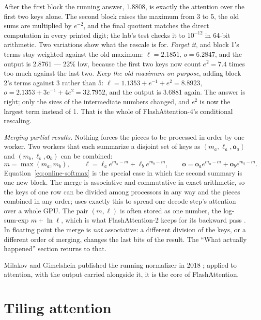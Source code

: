 \noindent After the first block the running answer, 1.8808, is exactly the
attention over the first two keys alone. The second block raises the maximum
from 3 to 5, the old sums are multiplied by $e^{-2}$, and the final quotient
matches the direct computation in every printed digit; the lab's test checks it
to $10^{-12}$ in 64-bit arithmetic. Two variations show what the rescale is for.
\emph{Forget it}, and block 1's terms stay weighted against the old maximum:
$\ell = 2.1851$, $o = 6.2847$, and the output is 2.8761 --- 22\% low, because
the first two keys now count $e^{2} = 7.4$ times too much against the last two.
\emph{Keep the old maximum on purpose}, adding block 2's terms against 3 rather
than 5: $\ell = 1.1353 + e^{-1} + e^{2} = 8.8923$,
$o = 2.1353 + 3e^{-1} + 4e^{2} = 32.7952$, and the output is 3.6881 again. The
answer is right; only the sizes of the intermediate numbers changed, and
$e^{2}$ is now the largest term instead of 1. That is the whole of
FlashAttention-4's conditional rescaling.

\emph{Merging partial results.} Nothing forces the pieces to be processed in
order by one worker. Two workers that each summarize a disjoint set of keys as
$(m_a, \ell_a, \mathbf{o}_a)$ and $(m_b, \ell_b, \mathbf{o}_b)$ can be combined:
\begin{equation}
m = \max(m_a, m_b),\qquad
\ell = \ell_a e^{m_a-m} + \ell_b e^{m_b-m},\qquad
\mathbf{o} = \mathbf{o}_a e^{m_a-m} + \mathbf{o}_b e^{m_b-m}.
\label{eq:softmax-merge}
\end{equation}
Equation~\eqref{eq:online-softmax} is the special case in which the second
summary is one new block. The merge is associative and commutative in exact
arithmetic, so the keys of one row can be divided among processors in any way
and the pieces combined in any order;  uses exactly this
to spread one decode step's attention over a whole GPU. The pair $(m, \ell)$ is
often stored as one number, the log-sum-exp $m + \ln \ell$, which is what
FlashAttention-2 keeps for its backward pass \cite{dao2023flashattention2}. In
floating point the merge is \emph{not} associative: a different division of the
keys, or a different order of merging, changes the last bits of the result.
The ``What actually happened'' section returns to that.

Milakov and Gimelshein published the running normalizer in 2018
\cite{milakov2018online}; applied to attention, with the output carried
alongside it, it is the core of FlashAttention.

\section{Tiling attention}

